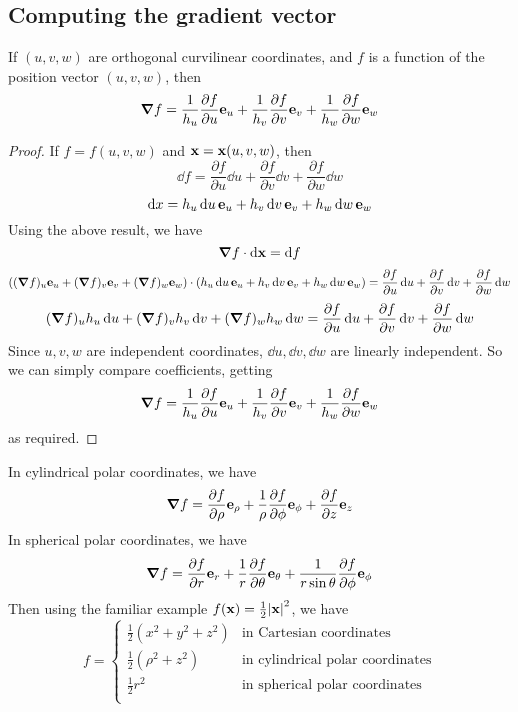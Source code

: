 \subsection{Computing the gradient vector}
\begin{proposition}
	If \((u, v, w)\) are orthogonal curvilinear coordinates, and \(f\) is a function of the position vector \((u, v, w)\), then
	\[
		\grad f = \frac{1}{h_u}\frac{\partial f}{\partial u}\vb e_u + \frac{1}{h_v}\frac{\partial f}{\partial v}\vb e_v + \frac{1}{h_w}\frac{\partial f}{\partial w}\vb e_w
	\]
\end{proposition}
\begin{proof}
	If \(f = f(u, v, w)\) and \(\vb x = \vb x(u, v, w)\), then
	\[
		\dd{f} = \frac{\partial f}{\partial u}\dd{u} + \frac{\partial f}{\partial v}\dd{v} + \frac{\partial f}{\partial w}\dd{w}
	\]
	\[
		\dd{x} = h_u \dd{u} \vb e_u + h_v \dd{v} \vb e_v + h_w \dd{w} \vb e_w
	\]
	Using the above result, we have
	\[
		\grad f \cdot \dd \vb x = \dd{f}
	\]
	\[
		\left( (\grad f)_u \vb e_u + (\grad f)_v \vb e_v + (\grad f)_w \vb e_w \right) \cdot \left( h_u \dd{u} \vb e_u + h_v \dd{v} \vb e_v + h_w \dd{w} \vb e_w \right) = \frac{\partial f}{\partial u}\dd{u} + \frac{\partial f}{\partial v}\dd{v} + \frac{\partial f}{\partial w}\dd{w}
	\]
	\[
		(\grad f)_u h_u \dd{u} + (\grad f)_v h_v \dd{v} + (\grad f)_w h_w \dd{w} = \frac{\partial f}{\partial u}\dd{u} + \frac{\partial f}{\partial v}\dd{v} + \frac{\partial f}{\partial w}\dd{w}
	\]
	Since \(u, v, w\) are independent coordinates, \(\dd{u}, \dd{v}, \dd{w}\) are linearly independent.
	So we can simply compare coefficients, getting
	\[
		\grad f = \frac{1}{h_u}\frac{\partial f}{\partial u}\vb e_u + \frac{1}{h_v}\frac{\partial f}{\partial v}\vb e_v + \frac{1}{h_w}\frac{\partial f}{\partial w}\vb e_w
	\]
	as required.
\end{proof}
\noindent In cylindrical polar coordinates, we have
\[
	\grad f = \frac{\partial f}{\partial \rho} \vb e_\rho + \frac{1}{\rho} \frac{\partial f}{\partial \phi} \vb e_\phi + \frac{\partial f}{\partial z} \vb e_z
\]
In spherical polar coordinates, we have
\[
	\grad f = \frac{\partial f}{\partial r} \vb e_r + \frac{1}{r} \frac{\partial f}{\partial \theta} \vb e_\theta + \frac{1}{r\sin\theta} \frac{\partial f}{\partial \phi} \vb e_\phi
\]
Then using the familiar example \(f(\vb x) = \frac{1}{2}\abs{\vb x}^2\), we have
\[
	f = \begin{cases}
		\frac{1}{2}(x^2 + y^2 + z^2) & \text{in Cartesian coordinates}         \\
		\frac{1}{2}(\rho^2 + z^2)    & \text{in cylindrical polar coordinates} \\
		\frac{1}{2}r^2               & \text{in spherical polar coordinates}   \\
	\end{cases}
\]
